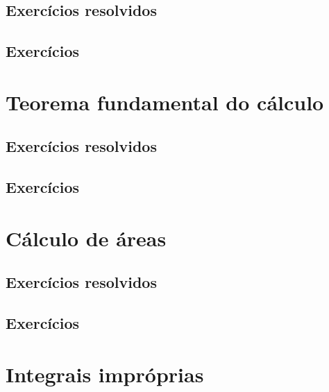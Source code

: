\subsection*{Exercícios resolvidos}

\construirExeresol


\subsection*{Exercícios}

\construirExer


\section{Teorema fundamental do cálculo}
\construirSec

\subsection*{Exercícios resolvidos}

\construirExeresol


\subsection*{Exercícios}

\construirExer


\section{Cálculo de áreas}
\construirSec

\subsection*{Exercícios resolvidos}

\construirExeresol


\subsection*{Exercícios}

\construirExer


\section{Integrais impróprias}
\construirSec


